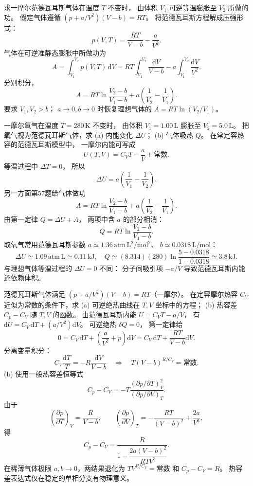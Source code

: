 求一摩尔范德瓦耳斯气体在温度 $T$ 不变时，
由体积 $V_1$ 可逆等温膨胀至 $V_2$ 所做的功。
假定气体遵循
$(p+a/V^2)(V-b)=RT$。
\exsolution
将范德瓦耳斯方程解成压强形式：
\[
p(V,T)=\frac{RT}{V-b}-\frac a{V^2}.
\]
气体在可逆准静态膨胀中所做功为
\[
A=\int_{V_1}^{V_2}p(V,T)\,\mathrm dV
=RT\int_{V_1}^{V_2}\frac{\mathrm dV}{V-b}
-a\int_{V_1}^{V_2}\frac{\mathrm dV}{V^2}.
\]
分别积分，
\[
\boxed{A=
RT\ln\frac{V_2-b}{V_1-b}
+a\left(\frac1{V_2}-\frac1{V_1}\right)}.
\]
\excheck 要求 $V_1,V_2>b$；
$a\to0,b\to0$ 时恢复理想气体的
$A=RT\ln(V_2/V_1)$。

一摩尔氧气在温度
$T=280\,\mathrm K$ 不变时，
由体积 $V_1=1.00\,\mathrm L$
膨胀至 $V_2=5.0\,\mathrm L$。
把氧气视为范德瓦耳斯气体，求
(a) 内能变化 $\Delta U$；
(b) 气体吸热 $Q$。
\exsolution
在常定容热容的范德瓦耳斯模型中，
一摩尔内能可写成
\[
U(T,V)=C_VT-\frac aV+\text{常数}.
\]
等温过程中 $\Delta T=0$，
所以
\[
\boxed{\Delta U=a\left(\frac1{V_1}-\frac1{V_2}\right)}.
\]
另一方面第57题给气体做功
\[
A=RT\ln\frac{V_2-b}{V_1-b}
+a\left(\frac1{V_2}-\frac1{V_1}\right).
\]
由第一定律 $Q=\Delta U+A$，
两项中含 $a$ 的部分相消：
\[
\boxed{Q=RT\ln\frac{V_2-b}{V_1-b}}.
\]
取氧气常用范德瓦耳斯参数
$a\simeq1.36\,\mathrm{atm\,L^2/mol^2}$、
$b\simeq0.0318\,\mathrm{L/mol}$：
\[
\Delta U\simeq1.09\,\mathrm{atm\,L}
\simeq\boxed{0.11\,\mathrm{kJ}},
\quad
Q\simeq(8.314)(280)
\ln\frac{5-0.0318}{1-0.0318}
\simeq\boxed{3.8\,\mathrm{kJ}}.
\]
\excheck 与理想气体等温过程的 $\Delta U=0$ 不同：
分子间吸引项 $-a/V$ 导致范德瓦耳斯内能
还依赖体积。

范德瓦耳斯气体满足
$(p+a/V^2)(V-b)=RT$（一摩尔）。
在定容摩尔热容 $C_V$ 近似为常数的条件下，求
(a) 可逆绝热曲线在 $T,V$ 坐标中的方程；
(b) 热容差 $C_p-C_V$ 随 $T,V$ 的函数。
\exsolution
由范德瓦耳斯内能
$U=C_VT-a/V$，
有
$\mathrm dU=C_V\,\mathrm dT+(a/V^2)\mathrm dV$。
可逆绝热 $\delta Q=0$，
第一定律给
\[
0=C_V\,\mathrm dT+
\left(\frac a{V^2}+p\right)\mathrm dV
=C_V\,\mathrm dT+\frac{RT}{V-b}\mathrm dV.
\]
分离变量积分：
\[
C_V\frac{\mathrm dT}{T}
=-R\frac{\mathrm dV}{V-b}
\quad\Longrightarrow\quad
\boxed{T(V-b)^{R/C_V}=\text{常数}}.
\]
(b) 使用一般热容差恒等式
\[
C_p-C_V=
-T\frac{(\partial p/\partial T)_V^2}
{(\partial p/\partial V)_T}.
\]
由于
\[
\left(\frac{\partial p}{\partial T}\right)_V=\frac R{V-b},
\qquad
\left(\frac{\partial p}{\partial V}\right)_T
=-\frac{RT}{(V-b)^2}+\frac{2a}{V^3},
\]
得
\[
\boxed{C_p-C_V=
\frac R{1-\dfrac{2a(V-b)^2}{RTV^3}}}.
\]
\excheck 在稀薄气体极限
$a,b\to0$，两结果退化为
$TV^{R/C_V}=\text{常数}$ 和 $C_p-C_V=R$。
热容差表达式仅在稳定的单相分支有物理意义。

